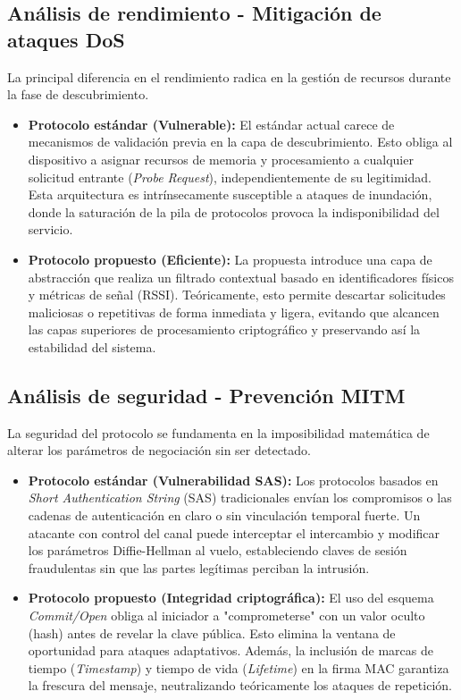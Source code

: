 \documentclass[conference,a4paper,onecolumn,11pt]{IEEEtran} %
\begin{document}
\subsection{Análisis de rendimiento - Mitigación de ataques DoS}
La principal diferencia en el rendimiento radica en la gestión de recursos durante la fase de descubrimiento.

\begin{itemize}
    \item \textbf{Protocolo estándar (Vulnerable):} El estándar actual carece de mecanismos de validación previa en la capa de descubrimiento. Esto obliga al dispositivo a asignar recursos de memoria y procesamiento a cualquier solicitud entrante (\textit{Probe Request}), independientemente de su legitimidad. Esta arquitectura es intrínsecamente susceptible a ataques de inundación, donde la saturación de la pila de protocolos provoca la indisponibilidad del servicio.
    \item \textbf{Protocolo propuesto (Eficiente):} La propuesta introduce una capa de abstracción que realiza un filtrado contextual basado en identificadores físicos y métricas de señal (RSSI). Teóricamente, esto permite descartar solicitudes maliciosas o repetitivas de forma inmediata y ligera, evitando que alcancen las capas superiores de procesamiento criptográfico y preservando así la estabilidad del sistema.
\end{itemize}

\subsection{Análisis de seguridad - Prevención MITM}
La seguridad del protocolo se fundamenta en la imposibilidad matemática de alterar los parámetros de negociación sin ser detectado.

\begin{itemize}
    \item \textbf{Protocolo estándar (Vulnerabilidad SAS):} Los protocolos basados en \textit{Short Authentication String} (SAS) tradicionales envían los compromisos o las cadenas de autenticación en claro o sin vinculación temporal fuerte. Un atacante con control del canal puede interceptar el intercambio y modificar los parámetros Diffie-Hellman al vuelo, estableciendo claves de sesión fraudulentas sin que las partes legítimas perciban la intrusión.
    
    \item \textbf{Protocolo propuesto (Integridad criptográfica):} El uso del esquema \textit{Commit/Open} obliga al iniciador a "comprometerse" con un valor oculto (hash) antes de revelar la clave pública. Esto elimina la ventana de oportunidad para ataques adaptativos. Además, la inclusión de marcas de tiempo (\textit{Timestamp}) y tiempo de vida (\textit{Lifetime}) en la firma MAC garantiza la frescura del mensaje, neutralizando teóricamente los ataques de repetición.
\end{itemize}
\end{document}
